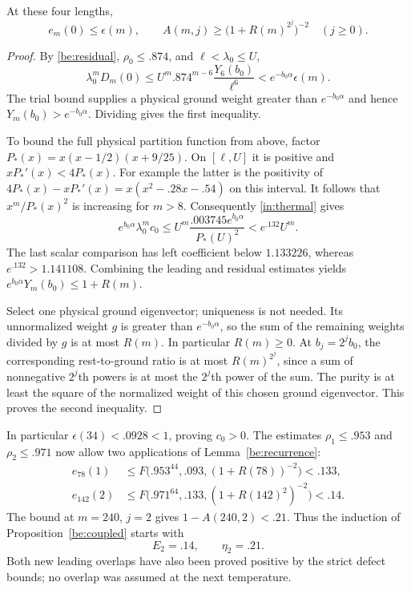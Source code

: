 \begin{lemma}\label{in:seedbounds}
At these four lengths,
\begin{equation}\label{in:seedineq}
 e_m(0)\le\epsilon(m),\qquad
 A(m,j)\ge\bigl(1+R(m)^{2^j}\bigr)^{-2}\quad(j\ge0).
\end{equation}
\end{lemma}
\begin{proof}
By \eqref{be:residual}, $\rho_0\le.874$, and
$\ell<\lambda_0\le U$,
\[
 \lambda_0^mD_m(0)
 \le U^m .874^{m-6}\frac{Y_6(b_0)}{\ell^6}
 <e^{-b_0\alpha}\epsilon(m).
\]
The trial bound supplies a physical ground weight greater than
$e^{-b_0\alpha}$ and hence $Y_m(b_0)>e^{-b_0\alpha}$.
Dividing gives the first inequality.

To bound the full physical partition function from above, factor
$P_*(x)=x(x-1/2)(x+9/25)$. On $[\ell,U]$ it is positive and
$xP_*'(x)<4P_*(x)$. For example the latter is the positivity of
$4P_*(x)-xP_*'(x)=x(x^2-.28x-.54)$ on this interval.
It follows that $x^m/P_*(x)^2$ is increasing for $m>8$.
Consequently \eqref{in:thermal} gives
\[
 e^{b_0\alpha}\lambda_0^mc_0
 \le U^m\frac{.003745e^{b_0\alpha}}{P_*(U)^2}
 <e^{.132}U^m.
\]
The last scalar comparison has left coefficient below $1.133226$,
whereas $e^{.132}>1.141108$. Combining the leading and residual
estimates yields $e^{b_0\alpha}Y_m(b_0)\le1+R(m)$.

Select one physical ground eigenvector; uniqueness is not needed.
Its unnormalized weight $g$ is greater than $e^{-b_0\alpha}$, so
the sum of the remaining weights divided by $g$ is at most $R(m)$.
In particular $R(m)\ge0$. At $b_j=2^jb_0$, the corresponding
rest-to-ground ratio is at most $R(m)^{2^j}$, since a sum of
nonnegative $2^j$th powers is at most the $2^j$th power of the sum.
The purity is at least the square of the normalized weight of this
chosen ground eigenvector. This proves the second inequality.
\end{proof}

In particular $\epsilon(34)<.0928<1$, proving $c_0>0$.
The estimates $\rho_1\le.953$ and $\rho_2\le.971$ now allow
two applications of Lemma~\ref{be:recurrence}:
\begin{align}
 e_{78}(1)&\le F\bigl(.953^{44},.093,(1+R(78))^{-2}\bigr)<.133,
                                                     \label{in:78}\\
 e_{142}(2)&\le F\bigl(.971^{64},.133,(1+R(142)^2)^{-2}\bigr)<.14.
                                                     \label{in:142}
\end{align}
The bound at $m=240$, $j=2$ gives $1-A(240,2)<.21$.
Thus the induction of Proposition~\ref{be:coupled} starts with
\begin{equation}\label{in:initial}
 E_2=.14,\qquad\eta_2=.21.
\end{equation}
Both new leading overlaps have also been proved positive by the strict
defect bounds; no overlap was assumed at the next temperature.

